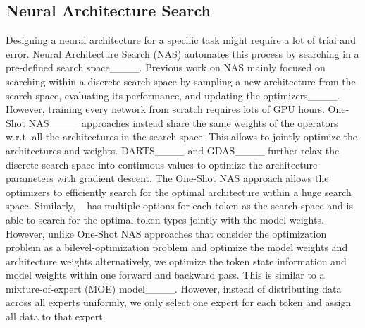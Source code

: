 \subsection{Neural Architecture Search}
Designing a neural architecture for a specific task might require a lot of trial and error. Neural Architecture Search (NAS) automates this process by searching in a pre-defined search space____. Previous work on NAS mainly focused on searching within a discrete search space by sampling a new architecture from the search space, evaluating its performance, and updating the optimizers____. However, training every network from scratch requires lots of GPU hours. One-Shot NAS____ approaches instead share the same weights of the operators w.r.t. all the architectures in the search space. This allows to jointly optimize the architectures and weights. DARTS____ and GDAS____ further relax the discrete search space into continuous values to optimize the architecture parameters with gradient descent. The One-Shot NAS approach allows the optimizers to efficiently search for the optimal architecture within a huge search space. Similarly, \ourname~ has multiple options for each token as the search space and is able to search for the optimal token types jointly with the model weights. However, unlike One-Shot NAS approaches that consider the optimization problem as a bilevel-optimization problem and optimize the model weights and architecture weights alternatively, we optimize the token state information and model weights within one forward and backward pass. This is similar to a mixture-of-expert (MOE) model____. However, instead of distributing data across all experts uniformly, we only select one expert for each token and assign all data to that expert.